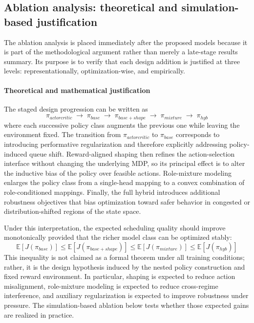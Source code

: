 \documentclass[journal]{IEEEtran}
\begin{document}
\subsection{Ablation analysis: theoretical and simulation-based justification}
The ablation analysis is placed immediately after the proposed models because it is part of the methodological argument rather than merely a late-stage results summary. Its purpose is to verify that each design addition is justified at three levels: representationally, optimization-wise, and empirically.

\paragraph{Theoretical and mathematical justification}
The staged design progression can be written as
\begin{equation}
\pi_{actorcritic}
\;\rightarrow\;
\pi_{base}
\;\rightarrow\;
\pi_{base+shape}
\;\rightarrow\;
\pi_{mixture}
\;\rightarrow\;
\pi_{hyb}
\end{equation}
where each successive policy class augments the previous one while leaving the environment fixed. The transition from $\pi_{actorcritic}$ to $\pi_{base}$ corresponds to introducing performative regularization and therefore explicitly addressing policy-induced queue shift. Reward-aligned shaping then refines the action-selection interface without changing the underlying MDP, so its principal effect is to alter the inductive bias of the policy over feasible actions. Role-mixture modeling enlarges the policy class from a single-head mapping to a convex combination of role-conditioned mappings. Finally, the full hybrid introduces additional robustness objectives that bias optimization toward safer behavior in congested or distribution-shifted regions of the state space.

Under this interpretation, the expected scheduling quality should improve monotonically provided that the richer model class can be optimized stably:
\begin{equation}
\mathbb{E}[J(\pi_{base})]
\leq
\mathbb{E}[J(\pi_{base+shape})]
\leq
\mathbb{E}[J(\pi_{mixture})]
\leq
\mathbb{E}[J(\pi_{hyb})]
\end{equation}
This inequality is not claimed as a formal theorem under all training conditions; rather, it is the design hypothesis induced by the nested policy construction and fixed reward environment. In particular, shaping is expected to reduce action misalignment, role-mixture modeling is expected to reduce cross-regime interference, and auxiliary regularization is expected to improve robustness under pressure. The simulation-based ablation below tests whether those expected gains are realized in practice.
\end{document}
